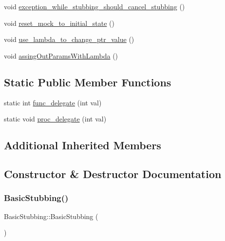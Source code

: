 \begin{DoxyCompactItemize}
\item 
void \mbox{\hyperlink{structBasicStubbing_af3d8327c5a9e9b27108763ddd017b50a}{exception\+\_\+while\+\_\+stubbing\+\_\+should\+\_\+cancel\+\_\+stubbing}} ()
\item 
void \mbox{\hyperlink{structBasicStubbing_af612deb877123e6802359f536a52fa27}{reset\+\_\+mock\+\_\+to\+\_\+initial\+\_\+state}} ()
\item 
void \mbox{\hyperlink{structBasicStubbing_ad40d93160d2ff18c0229ad4fbc3480bc}{use\+\_\+lambda\+\_\+to\+\_\+change\+\_\+ptr\+\_\+value}} ()
\item 
void \mbox{\hyperlink{structBasicStubbing_ad8651218b7b73892a107ef04d40c8b73}{assing\+Out\+Params\+With\+Lambda}} ()
\end{DoxyCompactItemize}
\subsection*{Static Public Member Functions}
\begin{DoxyCompactItemize}
\item 
static int \mbox{\hyperlink{structBasicStubbing_ae76f05070fe44582a9ae73a1a05df0d3}{func\+\_\+delegate}} (int val)
\item 
static void \mbox{\hyperlink{structBasicStubbing_a9d56380df4132a060fbe5ae38f671ed1}{proc\+\_\+delegate}} (int val)
\end{DoxyCompactItemize}
\subsection*{Additional Inherited Members}


\subsection{Constructor \& Destructor Documentation}
\mbox{\label{structBasicStubbing_a594b804ddcd4245e6c5cfbd2438cc970}} 
\subsubsection{\texorpdfstring{BasicStubbing()}{BasicStubbing()}}
{\footnotesize\ttfamily Basic\+Stubbing\+::\+Basic\+Stubbing (\begin{DoxyParamCaption}{ }\end{DoxyParamCaption})\hspace{0.3cm}{\ttfamily [inline]}}



